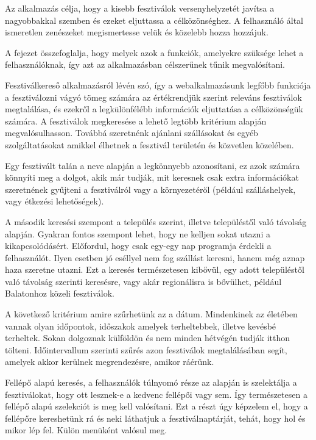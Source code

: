 
Az alkalmazás célja, hogy a kisebb fesztiválok versenyhelyzetét javítsa a nagyobbakkal szemben és ezeket eljuttassa a célközönséghez. A felhasználó által ismeretlen zenészeket megismertesse velük és közelebb hozza hozzájuk.

A fejezet összefoglalja, hogy melyek azok a funkciók, amelyekre szüksége lehet a felhasználóknak, így azt az alkalmazásban célszerűnek tűnik megvalósítani.


Fesztiválkereső alkalmazásról lévén szó, így a webalkalmazásunk legfőbb funkciója a fesztiválozni vágyó tömeg számára az értékrendjük szerint releváns fesztiválok megtalálása, és ezekről a legkülönfélébb információk eljuttatása a célközönségük számára. A fesztiválok megkeresése a lehető legtöbb kritérium alapján megvalósulhasson. Továbbá szeretnénk ajánlani szállásokat és egyéb szolgáltatásokat amikkel élhetnek a fesztivál területén és közvetlen közelében.


Egy fesztivált talán a neve alapján a legkönnyebb azonosítani, ez azok számára könnyíti meg a dolgot, akik már tudják, mit keresnek csak extra információkat szeretnének gyűjteni a fesztiválról vagy a környezetéről (például szálláshelyek, vagy étkezési lehetőségek).

A második keresési szempont a település szerint, illetve településtől való távolság alapján. Gyakran fontos szempont lehet, hogy ne kelljen sokat utazni a kikapcsolódásért. Előfordul, hogy csak egy-egy nap programja érdekli a felhasználót. Ilyen esetben jó eséllyel nem fog szállást keresni, hanem még aznap haza szeretne utazni. Ezt a keresés természetesen kibővül, egy adott településtől való távolság szerinti keresésre, vagy akár regionálisra is bővülhet, például Balatonhoz közeli fesztiválok.

A következő kritérium amire szűrhetünk az a dátum. Mindenkinek az életében vannak olyan időpontok, időszakok amelyek terheltebbek, illetve kevésbé terheltek. Sokan dolgoznak külföldön és nem minden hétvégén tudják itthon tölteni. Időintervallum szerinti szűrés azon fesztiválok megtalálásában segít, amelyek akkor kerülnek megrendezésre, amikor ráérünk.

Fellépő alapú keresés, a felhasználók túlnyomó része az alapján is szelektálja a fesztiválokat, hogy ott lesznek-e a kedvenc fellépői vagy sem. Így természetesen a fellépő alapú szelekciót is meg kell valósítani. Ezt a részt úgy képzelem el, hogy a fellépőre kereshetünk rá és neki láthatjuk a fesztiválnaptárját, tehát, hogy hol és mikor lép fel. Külön menüként valósul meg.

